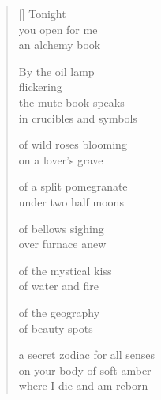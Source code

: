 \documentclass[12pt,a4paper]{article}
\begin{document}
\begin{verse}[\versewidth]
  Tonight \\
  you open for me \\
  an alchemy book

  By the oil lamp \\
  flickering \\
  the mute book speaks \\
  in crucibles and symbols

  of wild roses blooming \\
  on a lover's grave

  of a split pomegranate \\
  under two half moons

  of bellows sighing \\
  over furnace anew

  of the mystical kiss \\
  of water and fire

  of the geography \\
  of beauty spots

  a secret zodiac for all senses \\
  on your body of soft amber \\
  where I die and am reborn
\end{verse}


\newpage

\poemtitle{}

\settowidth{\versewidth}{and our breaths like geysers}

\bigskip
\end{document}
